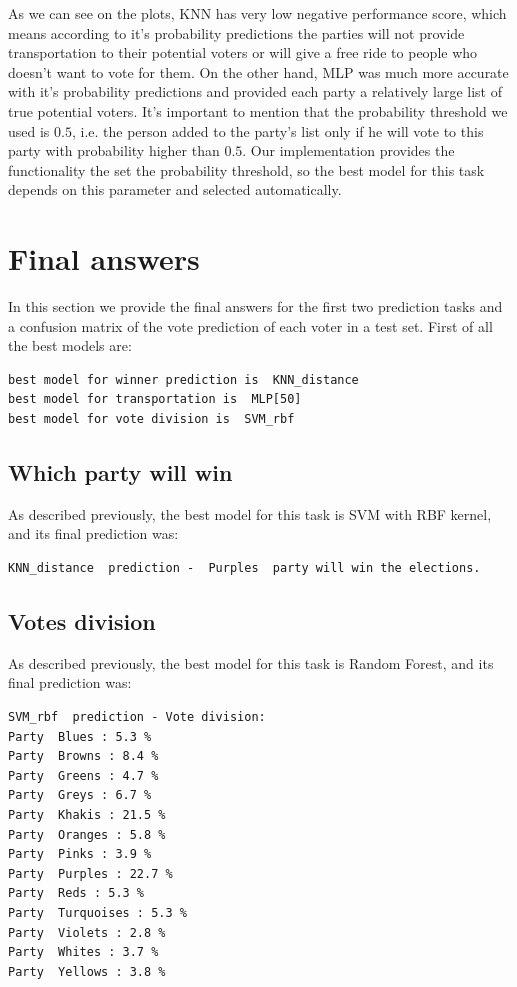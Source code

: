 \documentclass[12pt]{article}
\begin{document}
As we can see on the plots, KNN has very low negative performance score, which means according to it's probability predictions the parties will not provide transportation to their potential voters or will give a free ride to people who doesn't want to vote for them. On the other hand, MLP was much more accurate with it's probability predictions and provided each party a relatively large list of true potential voters. It's important to mention that the probability threshold we used is $0.5$, i.e. the person added to the party's list only if he will vote to this party with probability higher than $0.5$. Our implementation provides the functionality the set the probability threshold, so the best model for this task depends on this parameter and selected automatically. 


\newpage
\section{Final answers}
In this section we provide the final answers for the first two prediction tasks and a confusion matrix of the vote prediction of each voter in a test set. First of all the best models are:

\begin{verbatim}
best model for winner prediction is  KNN_distance
best model for transportation is  MLP[50]
best model for vote division is  SVM_rbf
\end{verbatim}

\subsection{Which party will win}
As described previously, the best model for this task is SVM with RBF kernel, and its final prediction was:
\begin{verbatim}
KNN_distance  prediction -  Purples  party will win the elections.
\end{verbatim}

\subsection{Votes division}
As described previously, the best model for this task is Random Forest, and its final prediction was:
\begin{verbatim}
SVM_rbf  prediction - Vote division:
Party  Blues : 5.3 %
Party  Browns : 8.4 %
Party  Greens : 4.7 %
Party  Greys : 6.7 %
Party  Khakis : 21.5 %
Party  Oranges : 5.8 %
Party  Pinks : 3.9 %
Party  Purples : 22.7 %
Party  Reds : 5.3 %
Party  Turquoises : 5.3 %
Party  Violets : 2.8 %
Party  Whites : 3.7 %
Party  Yellows : 3.8 %
\end{verbatim}
\end{document}
